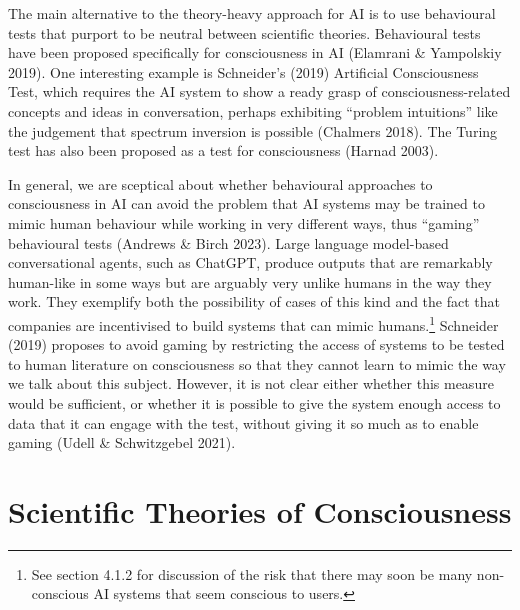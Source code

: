 \documentclass[12pt]{article}
\begin{document}
The main alternative to the theory-heavy approach for AI is to use behavioural tests that purport to be neutral between scientific theories. Behavioural tests have been proposed specifically for consciousness in AI (Elamrani \& Yampolskiy 2019). One interesting example is Schneider’s (2019) Artificial Consciousness Test, which requires the AI system to show a ready grasp of consciousness-related concepts and ideas in conversation, perhaps exhibiting ``problem intuitions'' like the judgement that spectrum inversion is possible (Chalmers 2018). The Turing test has also been proposed as a test for consciousness (Harnad 2003).

In general, we are sceptical about whether behavioural approaches to consciousness in AI can avoid the problem that AI systems may be trained to mimic human behaviour while working in very different ways, thus ``gaming'' behavioural tests (Andrews \& Birch 2023). Large language model-based conversational agents, such as ChatGPT, produce outputs that are remarkably human-like in some ways but are arguably very unlike humans in the way they work. They exemplify both the possibility of cases of this kind and the fact that companies are incentivised to build systems that can mimic humans.\footnote{See section 4.1.2 for discussion of the risk that there may soon be many non-conscious AI systems that seem conscious to users.} Schneider (2019) proposes to avoid gaming by restricting the access of systems to be tested to human literature on consciousness so that they cannot learn to mimic the way we talk about this subject. However, it is not clear either whether this measure would be sufficient, or whether it is possible to give the system enough access to data that it can engage with the test, without giving it so much as to enable gaming (Udell \& Schwitzgebel 2021).

\newpage

\section{Scientific Theories of Consciousness}
\end{document}
